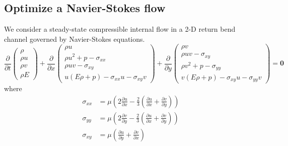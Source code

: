 \documentclass[a4paper,onecolumn]{article}
\theoremstyle{remark}
\begin{document}
\subsection{Optimize a Navier-Stokes flow}
We consider a steady-state compressible internal flow 
in a 2-D return bend channel governed by Navier-Stokes 
equations. 
\begin{equation}
    \frac{\partial}{\partial t}
    \begin{pmatrix}
        \rho \\ \rho u \\ \rho v\\ \rho E
    \end{pmatrix}
    + \frac{\partial}{\partial x} 
    \begin{pmatrix}
        \rho u\\
        \rho u^2 + p - \sigma_{xx}\\
        \rho uv - \sigma_{xy}\\
        u(E\rho+p) - \sigma_{xx} u - \sigma_{xy} v
    \end{pmatrix}
    + \frac{\partial}{\partial y}
    \begin{pmatrix}
        \rho v\\
        \rho uv-\sigma_{xy}\\
        \rho v^2+p-\sigma_{yy}\\
        v(E\rho+p) - \sigma_{xy} u -\sigma_{yy}v
    \end{pmatrix} 
    = \boldsymbol{0}
    \label{NSeqn}
\end{equation}
where
\begin{equation}\begin{split}
    \sigma_{xx} &= \mu \left(2 \frac{\partial u}{\partial x} - \frac{2}{3} \left(\frac{\partial u}{\partial x} 
    + \frac{\partial v}{\partial y}\right)\right)\\
    \sigma_{yy} &= \mu \left(2 \frac{\partial v}{\partial y} - \frac{2}{3} \left(\frac{\partial u}{\partial x} 
    + \frac{\partial v}{\partial y}\right)\right)\\
    \sigma_{xy}&=\mu\left(\frac{\partial u}{\partial y} + \frac{\partial v}{\partial x}\right)
\end{split}\end{equation}
\end{document}
